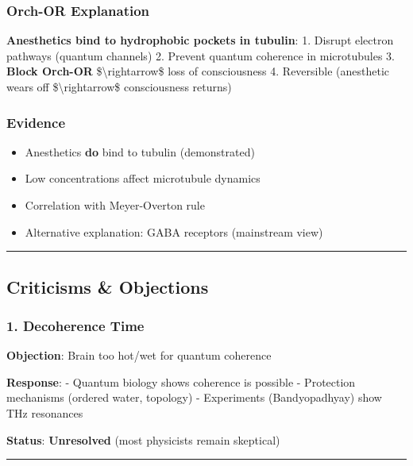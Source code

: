 \subsubsection{Orch-OR Explanation}\label{orch-or-explanation}

\textbf{Anesthetics bind to hydrophobic pockets in tubulin}: 1. Disrupt
electron pathways (quantum channels) 2. Prevent quantum coherence in
microtubules 3. \textbf{Block Orch-OR} \$\textbackslash rightarrow\$
loss of consciousness 4. Reversible (anesthetic wears off
\$\textbackslash rightarrow\$ consciousness returns)

\subsubsection{Evidence}\label{evidence}

\begin{itemize}
\tightlist
\item
  Anesthetics \textbf{do} bind to tubulin (demonstrated)
\item
  Low concentrations affect microtubule dynamics
\item
  Correlation with Meyer-Overton rule
\item
  Alternative explanation: GABA receptors (mainstream view)
\end{itemize}

\begin{center}\rule{0.5\linewidth}{0.5pt}\end{center}

\subsection{Criticisms \& Objections}\label{criticisms-objections}

\subsubsection{1. Decoherence Time}\label{decoherence-time}

\textbf{Objection}: Brain too hot/wet for quantum coherence

\textbf{Response}: - Quantum biology shows coherence is possible -
Protection mechanisms (ordered water, topology) - Experiments
(Bandyopadhyay) show THz resonances

\textbf{Status}: \textbf{Unresolved} (most physicists remain skeptical)

\begin{center}\rule{0.5\linewidth}{0.5pt}\end{center}

